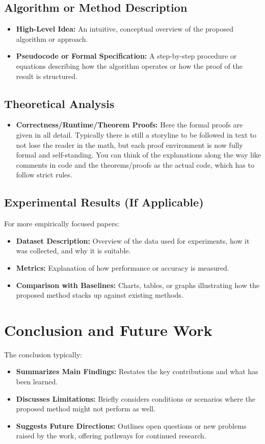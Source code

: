 \subsection{Algorithm or Method Description}
\begin{itemize}
    \item \textbf{High-Level Idea:} An intuitive, conceptual overview of the proposed algorithm or approach.
    \item \textbf{Pseudocode or Formal Specification:} A step-by-step procedure or equations describing how the algorithm operates or how the proof of the result is structured.
\end{itemize}

\subsection{Theoretical Analysis}
\begin{itemize}
    \item \textbf{Correctness/Runtime/Theorem Proofs:} Here the formal proofs are given in all detail. Typically there is still a storyline to be followed in text to not lose the reader in the math, but each proof environment is now fully formal and self-standing. You can think of the explanations along the way like comments in code and the theorems/proofs as the actual code, which has to follow strict rules.
\end{itemize}

\subsection{Experimental Results (If Applicable)}
For more empirically focused papers:
\begin{itemize}
    \item \textbf{Dataset Description:} Overview of the data used for experiments, how it was collected, and why it is suitable.
    \item \textbf{Metrics:} Explanation of how performance or accuracy is measured.
    \item \textbf{Comparison with Baselines:} Charts, tables, or graphs illustrating how the proposed method stacks up against existing methods.
\end{itemize}

\section{Conclusion and Future Work}
The conclusion typically:
\begin{itemize}
    \item \textbf{Summarizes Main Findings:} Restates the key contributions and what has been learned.
    \item \textbf{Discusses Limitations:} Briefly considers conditions or scenarios where the proposed method might not perform as well.
    \item \textbf{Suggests Future Directions:} Outlines open questions or new problems raised by the work, offering pathways for continued research.
\end{itemize}


